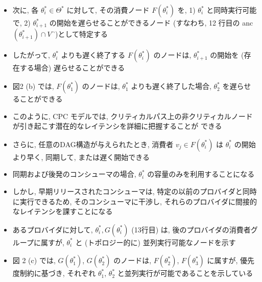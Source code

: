 \begin{frame}{}
    \begin{itemize}
        \item 次に, 各 $\theta_{i}^{*} \in \Theta^{*}$ に対して, その消費ノード $F\left(\theta_{i}^{*}\right)$ を, 1)  $\theta_{i}^{*}$ と同時実行可能で, 2)  $\theta_{i+1}^{*}$ の開始を遅らせることができるノード (すなわち, 12 行目の anc $\left(\theta_{i+1}^{*}\right) \cap V^{\neg}$)として特定する
        \item したがって, $\theta_{i}^{*}$ よりも遅く終了する $F\left(\theta_{i}^{*}\right)$ のノードは, $\theta_{i+1}^{*}$ の開始を (存在する場合) 遅らせることができる
        \item 図2 (b) では, $F\left(\theta_{1}^{*}\right)$ のノードは, $\theta_{1}^{*}$ よりも遅く終了した場合, $\theta_{2}^{*}$ を遅らせることができる
        \item このように, CPC モデルでは, クリティカルパス上の非クリティカルノードが引き起こす潜在的なレイテンシを詳細に把握することが できる
    \end{itemize}
\end{frame}

\begin{frame}{}
    \begin{itemize}
        \item さらに, 任意のDAG構造が与えられたとき, 消費者 $v_{j} \in F\left(\theta_{i}^{*}\right)$ は $\theta_{i}^{*}$ の開始より早く, 同期して, または遅く開始できる
        \item 同期および後発のコンシューマの場合, $\theta_{i}^{*}$ の容量のみを利用することになる
        \item しかし, 早期リリースされたコンシューマは, 特定の以前のプロバイダと同時に実行できるため, そのコンシューマに干渉し, それらのプロバイダに間接的なレイテンシを課すことになる
        \item あるプロバイダに対して, $\theta_{i}^{*}, G\left(\theta_{i}^{*}\right)$  (13行目) は, 後のプロバイダの消費者グループに属すが, $\theta_{i}^{*}$ と (トポロジー的に) 並列実行可能なノードを示す
        \item 図 2 (c) では, $G\left(\theta_{1}^{*}\right)$, $G\left(\theta_{2}^{*}\right)$ のノードは, $F\left(\theta_{2}^{*}\right)$, $F\left(\theta_{3}^{*}\right)$ に属すが, 優先度制約に基づき, それぞれ $\theta_{1}^{*}$, $\theta_{2}^{*}$ と並列実行が可能であることを示している
    \end{itemize}
\end{frame}

